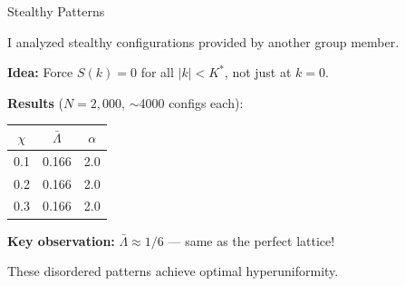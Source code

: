 \documentclass[aspectratio=169, 11pt]{beamer}
\begin{document}
\begin{frame}{Stealthy Patterns}

I analyzed stealthy configurations provided by another group member.

\vspace{0.3em}
\textbf{Idea:} Force $S(k) = 0$ for all $|k| < K^*$, not just at $k = 0$.

\vspace{0.5em}
\textbf{Results} ($N = 2{,}000$, $\sim$4000 configs each):
\begin{center}
\begin{tabular}{ccc}
\toprule
$\chi$ & $\bar{\Lambda}$ & $\alpha$ \\
\midrule
0.1 & 0.166 & 2.0 \\
0.2 & 0.166 & 2.0 \\
0.3 & 0.166 & 2.0 \\
\bottomrule
\end{tabular}
\end{center}

\vspace{0.5em}
\textbf{Key observation:} $\bar{\Lambda} \approx 1/6$ --- same as the perfect lattice!

\vspace{0.3em}
These disordered patterns achieve optimal hyperuniformity.
\end{frame}
\end{document}
